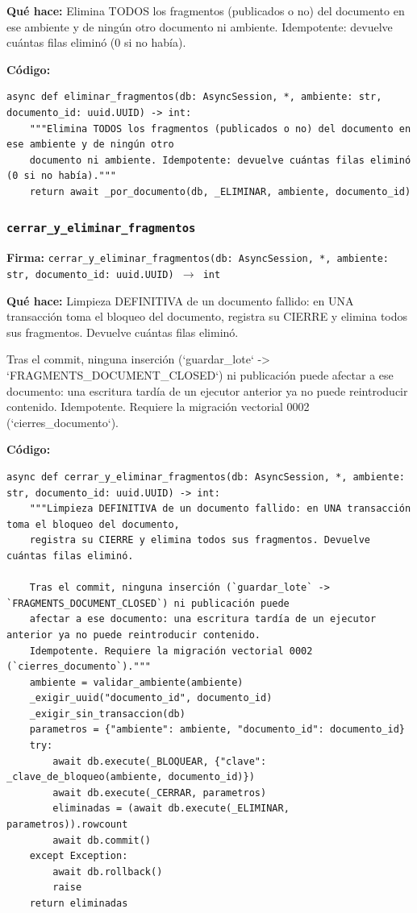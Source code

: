 \documentclass[11pt,a4paper]{article}
\begin{document}
\textbf{Qué hace:} Elimina TODOS los fragmentos (publicados o no) del documento en ese ambiente y de ningún otro
documento ni ambiente. Idempotente: devuelve cuántas filas eliminó (0 si no había).

\textbf{Código:}
\begin{lstlisting}
async def eliminar_fragmentos(db: AsyncSession, *, ambiente: str, documento_id: uuid.UUID) -> int:
    """Elimina TODOS los fragmentos (publicados o no) del documento en ese ambiente y de ningún otro
    documento ni ambiente. Idempotente: devuelve cuántas filas eliminó (0 si no había)."""
    return await _por_documento(db, _ELIMINAR, ambiente, documento_id)
\end{lstlisting}

\subsubsection*{\texttt{cerrar\_y\_eliminar\_fragmentos}}
\textbf{Firma:} \texttt{cerrar\_y\_eliminar\_fragmentos(db: AsyncSession, *, ambiente: str, documento\_id: uuid.UUID) $\rightarrow$ int}

\textbf{Qué hace:} Limpieza DEFINITIVA de un documento fallido: en UNA transacción toma el bloqueo del documento,
registra su CIERRE y elimina todos sus fragmentos. Devuelve cuántas filas eliminó.

Tras el commit, ninguna inserción (`guardar\_lote` -> `FRAGMENTS\_DOCUMENT\_CLOSED`) ni publicación puede
afectar a ese documento: una escritura tardía de un ejecutor anterior ya no puede reintroducir contenido.
Idempotente. Requiere la migración vectorial 0002 (`cierres\_documento`).

\textbf{Código:}
\begin{lstlisting}
async def cerrar_y_eliminar_fragmentos(db: AsyncSession, *, ambiente: str, documento_id: uuid.UUID) -> int:
    """Limpieza DEFINITIVA de un documento fallido: en UNA transacción toma el bloqueo del documento,
    registra su CIERRE y elimina todos sus fragmentos. Devuelve cuántas filas eliminó.

    Tras el commit, ninguna inserción (`guardar_lote` -> `FRAGMENTS_DOCUMENT_CLOSED`) ni publicación puede
    afectar a ese documento: una escritura tardía de un ejecutor anterior ya no puede reintroducir contenido.
    Idempotente. Requiere la migración vectorial 0002 (`cierres_documento`)."""
    ambiente = validar_ambiente(ambiente)
    _exigir_uuid("documento_id", documento_id)
    _exigir_sin_transaccion(db)
    parametros = {"ambiente": ambiente, "documento_id": documento_id}
    try:
        await db.execute(_BLOQUEAR, {"clave": _clave_de_bloqueo(ambiente, documento_id)})
        await db.execute(_CERRAR, parametros)
        eliminadas = (await db.execute(_ELIMINAR, parametros)).rowcount
        await db.commit()
    except Exception:
        await db.rollback()
        raise
    return eliminadas
\end{lstlisting}
\end{document}
